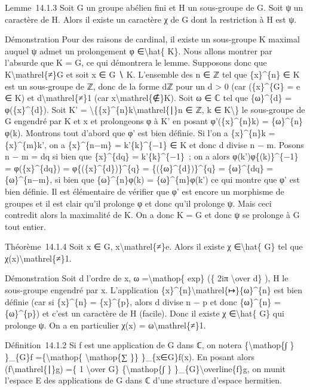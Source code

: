 \documentclass[]{article}
\begin{document}
Lemme~14.1.3 Soit G un groupe abélien fini et H un sous-groupe de G.
Soit ψ un caractère de H. Alors il existe un caractère χ de G dont la
restriction à H est ψ.

Démonstration Pour des raisons de cardinal, il existe un sous-groupe K
maximal auquel ψ admet un prolongement φ ∈\textbackslash{}hat\{ K\}.
Nous allons montrer par l'absurde que K = G, ce qui démontrera le lemme.
Supposons donc que K\textbackslash{}mathrel\{≠\}G et soit x ∈ G ∖ K.
L'ensemble des n ∈ ℤ tel que \{x\}\^{}\{n\} ∈ K est un sous-groupe de ℤ,
donc de la forme dℤ pour un d \textgreater{} 0 (car
(\{x\}\^{}\{\textbar{}G\textbar{}\} = e ∈ K) et
d\textbackslash{}mathrel\{≠\}1 (car x\textbackslash{}mathrel\{∉\}K).
Soit ω ∈ ℂ tel que \{ω\}\^{}\{d\} = φ(\{x\}\^{}\{d\}). Soit K' =
\textbackslash{}\{\{x\}\^{}\{n\}k\textbackslash{}mathrel\{∣\}n ∈ ℤ, k ∈
K\textbackslash{}\} le sous-groupe de G engendré par K et x et
prolongeons φ à K' en posant φ'(\{x\}\^{}\{n\}k) = \{ω\}\^{}\{n\}φ(k).
Montrons tout d'abord que φ' est bien définie. Si l'on a \{x\}\^{}\{n\}k
= \{x\}\^{}\{m\}k', on a \{x\}\^{}\{n−m\} = k'\{k\}\^{}\{−1\} ∈ K et
donc d divise n − m. Posons n − m = dq si bien que \{x\}\^{}\{dq\} =
k'\{k\}\^{}\{−1\}~; on a alors φ(k')φ\{(k)\}\^{}\{−1\} =
φ(\{x\}\^{}\{dq\}) = φ\{(\{x\}\^{}\{d\})\}\^{}\{q\} =
\{(\{ω\}\^{}\{d\})\}\^{}\{q\} = \{ω\}\^{}\{dq\} = \{ω\}\^{}\{n−m\}, si
bien que \{ω\}\^{}\{n\}φ(k) = \{ω\}\^{}\{m\}φ(k') ce qui montre que φ'
est bien définie. Il est élémentaire de vérifier que φ' est encore un
morphisme de groupes et il est clair qu'il prolonge φ et donc qu'il
prolonge ψ. Mais ceci contredit alors la maximalité de K. On a donc K =
G et donc ψ se prolonge à G tout entier.

Théorème~14.1.4 Soit x ∈ G, x\textbackslash{}mathrel\{≠\}e. Alors il
existe χ ∈\textbackslash{}hat\{ G\} tel que
χ(x)\textbackslash{}mathrel\{≠\}1.

Démonstration Soit d l'ordre de x, ω =\textbackslash{}mathop\{ exp\} (\{
2iπ \textbackslash{}over d\} ), H le sous-groupe engendré par x.
L'application \{x\}\^{}\{n\}\textbackslash{}mathrel\{↦\}\{ω\}\^{}\{n\}
est bien définie (car si \{x\}\^{}\{n\} = \{x\}\^{}\{p\}, alors d divise
n − p et donc \{ω\}\^{}\{n\} = \{ω\}\^{}\{p\}) et c'est un caractère de
H (facile). Donc il existe χ ∈\textbackslash{}hat\{ G\} qui prolonge ψ.
On a en particulier χ(x) = ω\textbackslash{}mathrel\{≠\}1.

Définition~14.1.2 Si f est une application de G dans ℂ, on notera
\{\textbackslash{}mathop\{∫ \} \}\_\{G\}f =\{\textbackslash{}mathop\{
\textbackslash{}mathop\{∑ \}\} \}\_\{x∈G\}f(x). En posant alors
(f\textbackslash{}mathrel\{∣\}g) =\{ 1 \textbackslash{}over
\textbar{}G\textbar{}\} \{\textbackslash{}mathop\{∫ \}
\}\_\{G\}\textbackslash{}overline\{f\}g, on munit l'espace E des
applications de G dans ℂ d'une structure d'espace hermitien.
\end{document}
